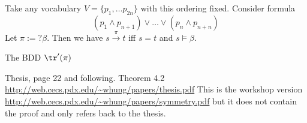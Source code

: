 
Take any vocabulary $V = \{p_1, \dots p_{2n}\}$ with this ordering fixed.
Consider formula
\[ (p_1 \land p_{n+1} ) \lor \ldots \lor (p_n \land p_{n+n}) \]
Let $\pi := ? \beta$.
Then we have $s \xrightarrow{\pi} t $
iff $s = t$ and $s \vDash \beta$.

The BDD $\tr'(\pi)$ 










Thesis, page 22 and following. Theorem 4.2
\url{http://web.cecs.pdx.edu/~whung/papers/thesis.pdf}
This is the workshop version
\url{http://web.cecs.pdx.edu/~whung/papers/symmetry.pdf}
but it does not contain the proof and only refers back to the thesis.

